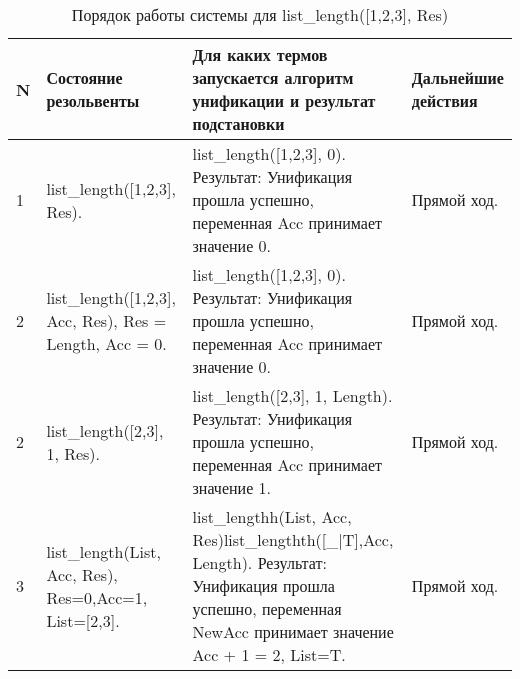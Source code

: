 \begin{table}[!ht]
	\begin{center}
		\begin{threeparttable}

			\captionsetup{justification=raggedright,singlelinecheck=off}
			\caption{Порядок работы системы для
				list\_length([1,2,3], Res)}
			\begin{tabular}{|m{0.5cm}|m{3.5cm}|m{8.5cm}|m{3cm}|}
				\hline
				\textbf{N}                                                                 & \textbf{Состояние резольвенты}                                                & \textbf{Для каких термов
				запускается алгоритм унификации и результат подстановки}                   & \textbf{Дальнейшие
				действия}                                                                                                                                                                                          \\
				\hline
				1                                                                          & list\_length([1,2,3], Res).                                                   & list\_length([1,2,3], 0). Результат:
				Унификация прошла успешно, переменная Acc принимает значение 0.            & Прямой ход.
				\\
				\hline
				2                                                                          & list\_length([1,2,3], Acc, Res), \newline Res = Length, \newline Acc = 0.                       &
				list\_length([1,2,3], 0). Результат: Унификация прошла успешно, переменная Acc
				принимает значение 0.                                                      & Прямой ход.                                                                                                           \\
				\hline
				2                                                                          & list\_length([2,3], 1, Res).                                                  & list\_length([2,3], 1, Length).
				Результат: Унификация прошла успешно, переменная Acc принимает значение 1. &
				Прямой ход.                                                                                                                                                                                        \\
				\hline
				3                                                                          & list\_length(List, Acc, Res), \newline Res=0,\newline Acc=1, \newline List=[2,3].
				                                                                           & list\_lengthh(List, Acc, Res)list\_lengthth([\_|T],Acc, Length). Результат:
				Унификация прошла успешно, переменная NewAcc принимает значение Acc + 1 = 2,
				List=T.                                                                    & Прямой ход.                                                                                                           \\
				\hline


\end{tabular}
\end{threeparttable}
\end{center}
\end{table}
